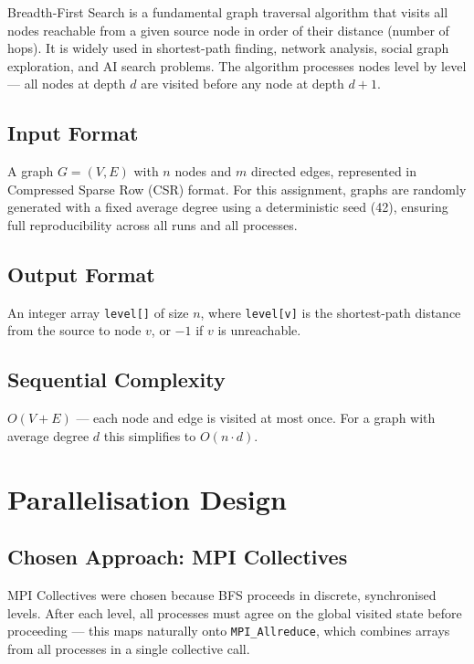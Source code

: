 \documentclass[12pt,a4paper]{article}
\begin{document}
Breadth-First Search is a fundamental graph traversal algorithm that visits all
nodes reachable from a given source node in order of their distance (number of
hops). It is widely used in shortest-path finding, network analysis, social graph
exploration, and AI search problems. The algorithm processes nodes level by level
--- all nodes at depth $d$ are visited before any node at depth $d+1$.

\subsection{Input Format}

A graph $G = (V, E)$ with $n$ nodes and $m$ directed edges, represented in
Compressed Sparse Row (CSR) format. For this assignment, graphs are randomly
generated with a fixed average degree using a deterministic seed (42), ensuring
full reproducibility across all runs and all processes.

\subsection{Output Format}

An integer array \texttt{level[]} of size $n$, where \texttt{level[v]} is the
shortest-path distance from the source to node $v$, or $-1$ if $v$ is unreachable.

\subsection{Sequential Complexity}

$O(V + E)$ --- each node and edge is visited at most once. For a graph with
average degree $d$ this simplifies to $O(n \cdot d)$.

\section{Parallelisation Design}

\subsection{Chosen Approach: MPI Collectives}

MPI Collectives were chosen because BFS proceeds in discrete, synchronised
levels. After each level, all processes must agree on the global visited state
before proceeding --- this maps naturally onto \texttt{MPI\_Allreduce}, which
combines arrays from all processes in a single collective call.
\end{document}
